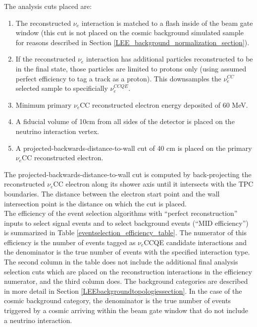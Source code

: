 The analysis cuts placed are:
\begin{enumerate}
\item The reconstructed $\nu_e$ interaction is matched to a flash inside of the beam gate window (this cut is not placed on the cosmic background simulated sample for reasons described in Section \ref{LEE_background_normalization_section}).
\item If the reconstructed $\nu_e$ interaction has additional particles reconstructed to be in the final state, those particles are limited to protons only (using assumed perfect efficiency to tag a track as a proton). This downsamples the $\nu_e^{CC}$ selected sample to specificially $\nu_e^{CCQE}$.
\item Minimum primary $\nu_e$CC reconstructed electron energy deposited of 60 MeV.
\item A fiducial volume of 10cm from all sides of the detector is placed on the neutrino interaction vertex.
\item A projected-backwards-distance-to-wall cut of 40 cm is placed on the primary $\nu_e$CC reconstructed electron.
\end{enumerate}
The projected-backwards-distance-to-wall cut is computed by back-projecting the reconstructed $\nu_e$CC electron along its shower axis until it intersects with the TPC boundaries. The distance between the electron start point and the wall intersection point is the distance on which the cut is placed.\\


The efficiency of the event selection algorithms with ``perfect reconstruction'' inputs to select signal events and to select background events (``MID efficiency'') is summarized in Table \ref{eventselection_efficiency_table}. The numerator of this efficiency is the number of events tagged as $\nu_e$CCQE candidate interactions and the denominator is the true number of events with the specified interaction type. The second column in the table does not include the additional final analysis selection cuts which are placed on the reconstruction interactions in the efficiency numerator, and the third column does. The background categories are described in more detail in Section \ref{LEEbackgroundtopologiessection}. In the case of the cosmic background category, the denominator is the true number of events triggered by a cosmic arriving within the beam gate window that do not include a neutrino interaction.\\


